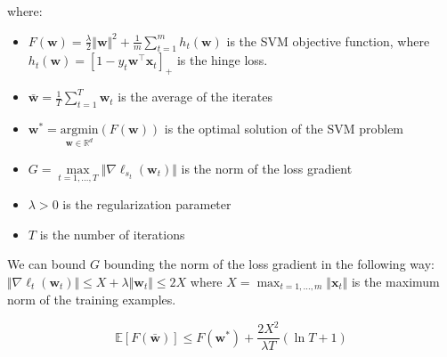 \begin{itemize}
        where:
        \begin{itemize}
            \item $F(\boldsymbol{w}) = \frac{\lambda}{2} \Vert \boldsymbol{w} \Vert^2 + \frac{1}{m} \sum_{t = 1}^m h_{t}(\boldsymbol{w})$ is the SVM objective function, where $h_{t}(\boldsymbol{w}) = \left[1 - y_t \boldsymbol{w}^\top \boldsymbol{x}_t \right]_+$ is the hinge loss.
            \item $\bar{\boldsymbol{w}} = \frac{1}{T} \sum_{t = 1}^T \boldsymbol{w}_t$ is the average of the iterates
            \item $\boldsymbol{w}^* = \underset{\boldsymbol{w} \in \mathbb{R}^d}{\text{argmin}} (F(\boldsymbol{w}))$ is the optimal solution of the SVM problem
            \item $G = \underset{t=1,\dots,T}{\max} \Vert \nabla \ell_{s_t}(\boldsymbol{w}_t) \Vert$ is the norm of the loss gradient            
            \item $\lambda > 0$ is the regularization parameter
            \item $T$ is the number of iterations
        \end{itemize}
        
        We can bound $G$ bounding the norm of the loss gradient in the following way: $\Vert \nabla \ell_t(\boldsymbol{w}_t) \Vert \leq X + \lambda \Vert \boldsymbol{w}_t \Vert \leq 2X$ where $X = \max_{t = 1, \dots, m} \Vert \boldsymbol{x}_t \Vert$ is the maximum norm of the training examples.

        $$
    \mathbb{E}\left[F(\bar{\boldsymbol{w}})\right] \leq F(\boldsymbol{w}^*) + \frac{2 X^2}{\lambda T} (\ln T + 1)
        $$
\end{itemize}
